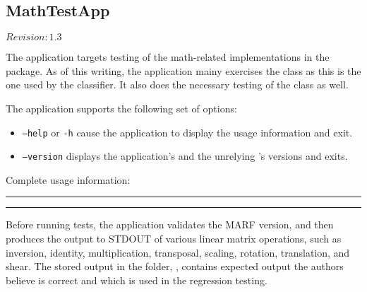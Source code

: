 \subsection{MathTestApp}

$Revision: 1.3 $

The  application targets
testing of the math-related implementations in the
 package. As of this writing, the
application mainy exercises the  class
as this is the one used by the 
classifier. It also does the necessary testing
of the  class as well.

The application supports the following set of options:

\begin{itemize}
\item
\texttt{--help} or \texttt{-h} cause the application to
display the usage information and exit.

\item
\texttt{--version} displays the application's and the
unrelying {\marf}'s versions and exits.
\end{itemize}

\noindent
Complete usage information:

\vspace{15pt}
\hrule

\hrule
\vspace{15pt}

Before running tests, the application validates the
MARF version, and then produces the output to STDOUT of
various linear matrix operations, such as inversion,
identity, multiplication, transposal, scaling, rotation,
translation, and shear. The stored
output in the  folder, ,
contains expected output the authors believe is correct
and which is used in the regression testing.

